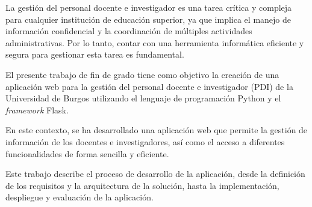 
La gestión del personal docente e investigador es una tarea crítica y compleja para cualquier institución de educación superior, ya que implica el manejo de información confidencial y la coordinación de múltiples actividades administrativas. 
Por lo tanto, contar con una herramienta informática eficiente y segura para gestionar esta tarea es fundamental.

El presente trabajo de fin de grado tiene como objetivo la creación de una aplicación web para la gestión del personal docente e investigador (PDI) de la Universidad de Burgos utilizando el lenguaje de programación Python y el \textit{framework} Flask.

En este contexto, se ha desarrollado una aplicación web que permite la gestión de información de los docentes e investigadores, así como el acceso a diferentes funcionalidades de forma sencilla y eficiente. 

Este trabajo describe el proceso de desarrollo de la aplicación, desde la definición de los requisitos y la arquitectura de la solución, hasta la implementación, despliegue y evaluación de la aplicación. 